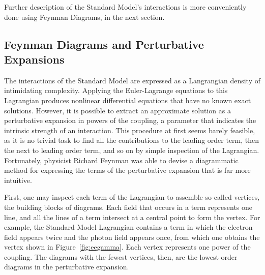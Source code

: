   Further description of the Standard Model's interactions is more conveniently done using Feynman Diagrams, in the next section.

  \subsection{Feynman Diagrams and Perturbative Expansions} \label{sec:feyndiags}

  The interactions of the Standard Model are expressed as a Langrangian density of intimidating complexity.
  Applying the Euler-Lagrange equations to this Lagrangian produces nonlinear differential equations that have no known exact solutions.
  However, it is possible to extract an approximate solution as a perturbative expansion in powers of the coupling, a parameter that indicates the intrinsic strength of an interaction.
  This procedure at first seems barely feasible, as it is no trivial task to find all the contributions to the leading order term, then the next to leading order term, and so on by simple inspection of the Lagrangian.
  Fortunately, physicist Richard Feynman was able to devise a diagrammatic method for expressing the terms of the perturbative expansion that is far more intuitive.

  First, one may inspect each term of the Lagrangian to assemble so-called vertices, the building blocks of diagrams.
  Each field that occurs in a term represents one line, and all the lines of a term intersect at a central point to form the vertex.
  For example, the Standard Model Lagrangian contains a term in which the electron field appears twice and the photon field appears once, from which one obtains the vertex shown in Figure~\ref{fig:eegamma}.
  Each vertex represents one power of the coupling.
  The diagrams with the fewest vertices, then, are the lowest order diagrams in the perturbative expansion.

